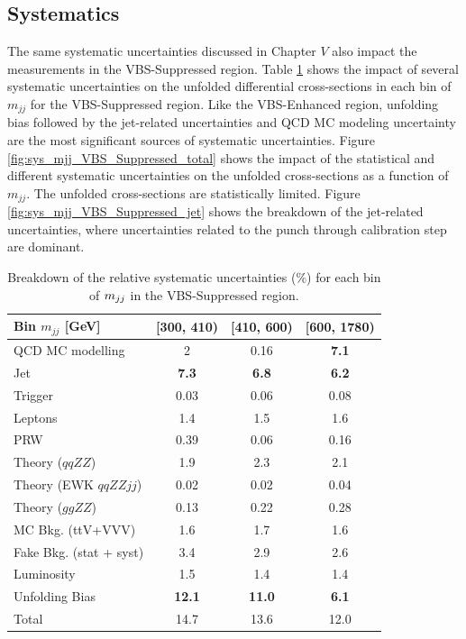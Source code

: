 \subsection{Systematics}
\label{appendix:VBSSupSys}
The same systematic uncertainties discussed in Chapter $V$ also impact the measurements in the VBS-Suppressed region. Table \ref{tab:systematics_mjj_VBS_Suppressed} shows the impact of several systematic uncertainties on the unfolded differential cross-sections in each bin of $m_{jj}$ for the VBS-Suppressed region. Like the VBS-Enhanced region, unfolding bias followed by the jet-related uncertainties and QCD MC modeling uncertainty are the most significant sources of systematic uncertainties. Figure \ref{fig:sys_mjj_VBS_Suppressed_total} shows the impact of the statistical and different systematic uncertainties on the unfolded cross-sections as a function of $m_{jj}$. The unfolded cross-sections are statistically limited. Figure \ref{fig:sys_mjj_VBS_Suppressed_jet} shows the breakdown of the jet-related uncertainties, where uncertainties related to the punch through calibration step are dominant.  

\begin{table}
    \centering
    \caption{Breakdown of the relative systematic uncertainties ($\%$) for each bin of $m_{jj}$ in the VBS-Suppressed region. \label{tab:systematics_mjj_VBS_Suppressed}}
    \begin{tabular}{|l || c | c | c | }
    \hline 
    Bin $m_{jj}$ [GeV] & [300, 410) & [410, 600) & [600, 1780)\\
    \hline 
    QCD MC modelling & 2 & 0.16 & \textbf{7.1}\\
    Jet & \textbf{7.3} & \textbf{6.8} & \textbf{6.2 }\\
    Trigger & 0.03 & 0.06 & 0.08 \\
    Leptons & 1.4 & 1.5 & 1.6 \\
    PRW & 0.39 & 0.06 & 0.16\\
    Theory ($qqZZ$) & 1.9 & 2.3 & 2.1 \\
    Theory (EWK $qqZZjj$) & 0.02 & 0.02 & 0.04 \\
    Theory ($ggZZ$) & 0.13 & 0.22 & 0.28 \\
    MC Bkg. (ttV+VVV) & 1.6 & 1.7 & 1.6 \\
    Fake Bkg. (stat + syst) & 3.4 & 2.9 & 2.6 \\
    Luminosity & 1.5 & 1.4 & 1.4 \\
    Unfolding Bias & \textbf{12.1} & \textbf{11.0} & \textbf{6.1}\\
    \hline
    Total & 14.7 & 13.6 & 12.0 \\
    \hline
    \end{tabular}
\end{table}


